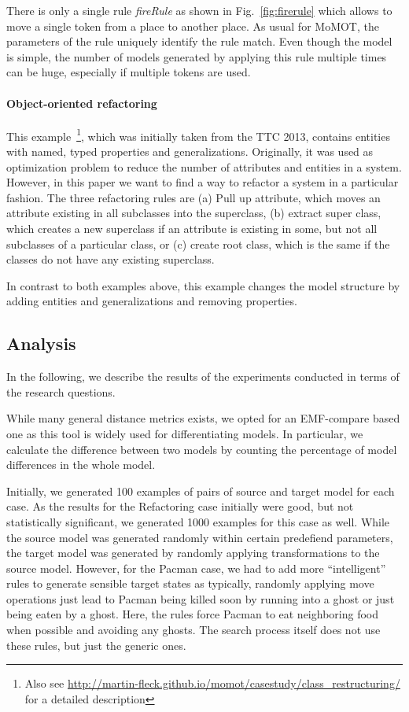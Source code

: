 There is only a single rule \textit{fireRule} as shown in Fig.~\ref{fig:firerule} which allows to move a single token from a place to another place. 
As usual for MoMOT, the parameters of the rule uniquely identify the rule match. Even though the model is simple, the number of models generated
by applying this rule multiple times can be huge, especially if multiple tokens are used.

\paragraph{Object-oriented refactoring}

This example~\footnote{Also see \url{http://martin-fleck.github.io/momot/casestudy/class_restructuring/} for a detailed description}, which was initially taken from the TTC 2013, contains entities with named, typed properties and generalizations. 
Originally, it was used as optimization problem to reduce the number of attributes and entities in a system. However, in this paper
we want to find a way to refactor a system in a particular fashion. The three refactoring rules are (a) Pull up attribute, which moves an attribute existing in all subclasses into the superclass, (b) extract super class, which creates a new superclass if an attribute is existing in some, but not all subclasses of a particular class, or (c) create root class, which is the same if the classes do not have any existing superclass.

In contrast to both examples above, this example changes the model structure by adding entities and generalizations and removing properties.



\subsection{Analysis}

In the following, we describe the results of the experiments conducted in terms of the research questions.


While many general distance metrics exists, we opted for an EMF-compare based one as this tool is widely used for differentiating models. In particular, we calculate the difference between two models by counting the percentage of model differences in the whole model.

Initially, we generated 100 examples of pairs of source and target model for each case. As the results for the Refactoring case initially were good, but not statistically significant, we generated 1000 examples for this case as well. While the source model was generated randomly within
certain predefiend parameters, the target model was generated by randomly applying transformations to the source model. 
However, for the Pacman case, we had to add more "`intelligent"' rules to generate sensible target states as typically, randomly applying move operations
just lead to Pacman being killed soon by running into a ghost or just being eaten by a ghost. Here, the rules force Pacman to eat neighboring food when possible and avoiding any ghosts. The search process itself does not use these rules, but just the generic ones.

